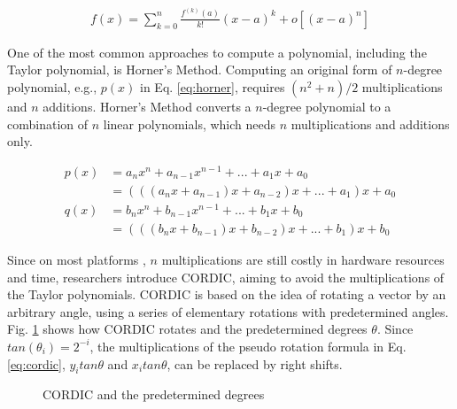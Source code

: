 \documentclass[12pt]{extbook}
\begin{document}
\begin{equation}
    \label{eq:taylor}
    \begin{aligned}
    f(x) = \sum_{k = 0}^{n}\frac{f^{(k)}(a)}{k!}(x - a)^k + o[(x - a) ^ n]
    \end{aligned}
    \end{equation}

One of the most common approaches to compute a polynomial, including the Taylor polynomial, is Horner's Method. Computing an original form of $n$-degree polynomial, e.g., $p(x)$ in Eq. \ref{eq:horner}, requires $(n^2 + n)/2$ multiplications and $n$ additions. Horner's Method converts a $n$-degree polynomial to a combination of $n$ linear polynomials, which needs $n$ multiplications and additions only.

\begin{equation}
    \label{eq:horner}
    \begin{aligned}
    p(x) &= a_n x^n + a_{n - 1}x^{n - 1} + ... + a_1 x + a_0 \\
         &= (((a_n x + a_{n - 1}) x + a_{n - 2})x + ... + a_1) x + a_0 \\
    q(x) &= b_n x^n + b_{n - 1}x^{n - 1} + ... + b_1 x + b_0 \\
         &= (((b_n x + b_{n - 1}) x + b_{n - 2})x + ... + b_1) x + b_0
    \end{aligned}
    \end{equation}

Since on most platforms \cite{XILINX, X86, CUDA}, $n$ multiplications are still costly in hardware resources and time, researchers introduce CORDIC, aiming to avoid the multiplications of the Taylor polynomials. CORDIC is based on the idea of rotating a vector by an arbitrary angle, using a series of elementary rotations with predetermined angles. Fig. \ref{fig:cordic} shows how CORDIC rotates and the predetermined degrees $\theta$. Since $tan(\theta_i) = 2^{-i}$, the multiplications of the pseudo rotation formula in Eq. \ref{eq:cordic}, $y_itan\theta$ and $x_itan\theta$, can be replaced by right shifts.

\begin{figure}[tbp]
    \caption{CORDIC and the predetermined degrees}
    \label{fig:cordic}
    \end{figure}
\end{document}
